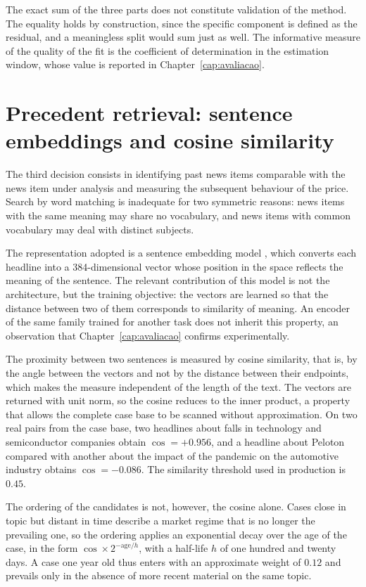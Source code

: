 The exact sum of the three parts does not constitute validation of the method. The equality holds
by construction, since the specific component is defined as the residual, and a meaningless split
would sum just as well. The informative measure of the quality of the fit is the coefficient of
determination in the estimation window, whose value is reported in
Chapter~\ref{cap:avaliacao}.

\section{Precedent retrieval: sentence embeddings and cosine similarity}
\label{sec:met_recuperacao}

The third decision consists in identifying past news items comparable with the news item under
analysis and measuring the subsequent behaviour of the price. Search by word matching is inadequate
for two symmetric reasons: news items with the same meaning may share no vocabulary, and news items
with common vocabulary may deal with distinct subjects.

The representation adopted is a sentence embedding model \autocite{reimers2019sbert}, which
converts each headline into a 384-dimensional vector whose position in the space reflects the
meaning of the sentence. The relevant contribution of this model is not the architecture, but the
training objective: the vectors are learned so that the distance between two of them corresponds to
similarity of meaning. An encoder of the same family trained for another task does not inherit this
property, an observation that Chapter~\ref{cap:avaliacao} confirms experimentally.

The proximity between two sentences is measured by cosine similarity, that is, by the angle
between the vectors and not by the distance between their endpoints, which makes the measure
independent of the length of the text. The vectors are returned with unit norm, so the cosine
reduces to the inner product, a property that allows the complete case base to be scanned without
approximation. On two real pairs from the case base, two headlines about falls in technology and
semiconductor companies obtain $\cos = +0.956$, and a headline about Peloton compared with another
about the impact of the pandemic on the automotive industry obtains $\cos = -0.086$. The similarity
threshold used in production is $0.45$.

The ordering of the candidates is not, however, the cosine alone. Cases close in topic but distant
in time describe a market regime that is no longer the prevailing one, so the ordering applies an
exponential decay over the age of the case, in the form $\cos \times 2^{-\text{age}/h}$, with a
half-life $h$ of one hundred and twenty days. A case one year old thus enters with an approximate
weight of $0.12$ and prevails only in the absence of more recent material on the same topic.

